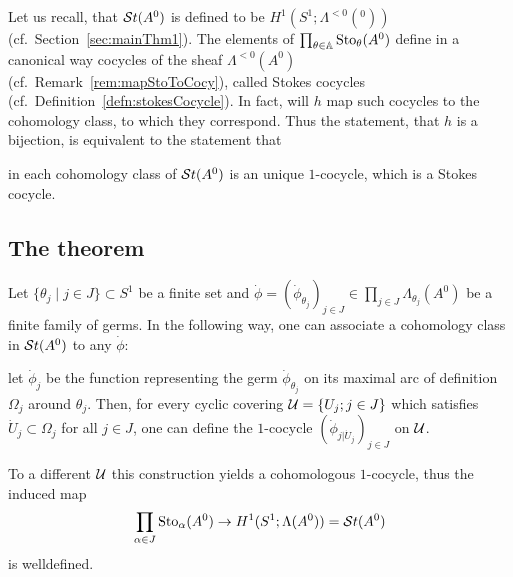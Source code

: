 Let us recall, that $\mathcal{S}{}t(A^0)$ is defined to be $H^1(S^1;\Lambda^{<0}(^0))$
(cf.\ Section~\ref{sec:mainThm1}).
The elements of $\prod_{\theta\in\mathbb{A}}\operatorname{Sto}_\theta(A^0)$ define in a canonical way
cocycles of the sheaf $\Lambda^{<0}(A^0)$ (cf.\ Remark~\ref{rem:mapStoToCocy}),
called Stokes cocycles (cf.\ Definition~\ref{defn:stokesCocycle}).
In fact, will $h$ map such cocycles to the cohomology class, to which they
correspond.
Thus the statement, that $h$ is a bijection, is equivalent to the statement
that
\begin{einr}
  in each cohomology class of $\mathcal{S}{}t(A^0)$ is an unique $1$-cocycle, which is a
  Stokes cocycle.
\end{einr}

\subsection{The theorem}
\begin{comment}
  \begin{lem}
    Since the sections of the sheaf $\Lambda(A^0)$ are solutions of the system
    $[A^0,A^0]$ (cf.\ Definition~\ref{defn:StokesSheaf}),
    the theory of differential equations\PROBLEM[source?] tells us that
    \rewrite{sections extend uniquely}.
    Thus we can extend any germ $\phi_\theta\in\Lambda_\theta(A^0)$ uniquely to
    a section $\phi\in\Gamma(\Omega;\Lambda(A^0))$, where $\Omega$ is the
    maximal arc of definition around $\theta$.

    \PROBLEM[The flatness proprerty implicitly satisfied?]
  \end{lem}
\end{comment}
\begin{rem}\label{rem:mapStoToCocy}
  Let $\{\theta_j\mid j\in J\}\subset S^1$ be a finite set and
  $\dot\phi=(\dot\phi_{\theta_j})_{j\in J}
  \in\prod_{j\in J}\Lambda_{\theta_j}(A^0)$ be a finite family of germs.
  In the following way, one can associate a cohomology class in $\mathcal{S}{}t(A^0)$ to
  any $\dot\phi$:
  \begin{einr}
    let $\dot\phi_j$ be the function representing the germ
    $\dot\phi_{\theta_j}$ on its maximal arc of definition $\Omega_j$ around
    $\theta_j$.
    Then, for every cyclic covering $\mathcal{U}=\{U_j;j\in J\}$ which satisfies
    $\dot U_j\subset \Omega_j$ for all $j\in J$, one can define the $1$-cocycle
    $(\dot\phi_{j|\dot U_j})_{j\in J}$ on $\mathcal{U}$.
  \end{einr}
  To a different $\mathcal{U}$ this construction yields a cohomologous
  $1$-cocycle\PROBLEM[Proof], thus the induced map
  \[
    \prod_{\alpha\in J}\operatorname{Sto}_\alpha(A^0)\to H^1(S^1;\Lambda(A^0))=\mathcal{S}{}t(A^0)
  \]
  is welldefined.
\end{rem}
